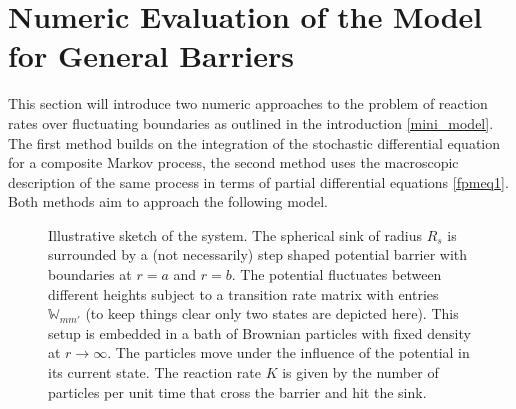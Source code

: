 \chapter{Numeric Evaluation of the Model for General Barriers}
\label{numeric_model}
This section will introduce two numeric approaches to the problem of reaction rates over fluctuating boundaries as outlined in the introduction \ref{mini_model}. The first method builds on the integration of the stochastic differential equation for a composite Markov process, the second method uses the macroscopic description of the same process in terms of partial differential equations \eqref{fpmeq1}. Both methods aim to approach the following model.\\

\begin{minipage}[t]{.5 \textwidth}
    \begin{figure}[H]
 \hspace{-1.8 cm}       
    \end{figure}
\end{minipage}\hspace{0.05 \textwidth}\begin{minipage}[t]{.45\textwidth}
    \begin{figure}[H]
        \caption{Illustrative sketch of the system. The spherical sink of radius $R_s$ is surrounded by a (not necessarily) step shaped potential barrier with boundaries at $r=a$ and $r=b$. The potential fluctuates between different heights subject to a transition rate matrix with entries $\mathbb{W}_{mm'}$ (to keep things clear only two states are depicted here). This setup is embedded in a bath of Brownian particles with fixed density at $r \rightarrow \infty$. The particles move under the influence of the potential in its current state. The reaction rate $K$ is given by the number of particles per unit time that cross the barrier and hit the sink.\label{skizze}}
    \end{figure}
\end{minipage}


